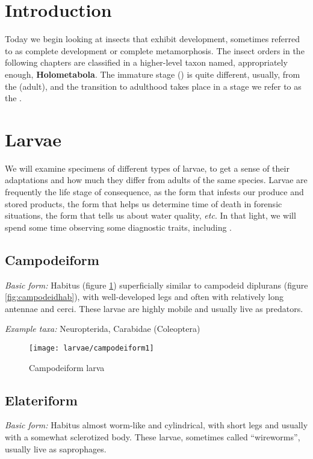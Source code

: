 \section*{Introduction}
Today we begin looking at insects that exhibit  development, sometimes referred to as complete development or complete metamorphosis. The insect orders in the following chapters are classified in a higher-level taxon named, appropriately enough, \textbf{Holometabola}. The immature stage () is quite different, usually, from the  (adult), and the transition to adulthood takes place in a stage we refer to as the . 

\section{Larvae}
We will examine specimens of different types of larvae, to get a sense of their adaptations and how much they differ from adults of the same species. Larvae are frequently the life stage of consequence, as the form that infests our produce and stored products, the form that helps us determine time of death in forensic situations, the form that tells us about water quality, \textit{etc}. In that light, we will spend some time observing some diagnostic traits, including .

\subsection{Campodeiform}
\noindent{}\textit{Basic form:} Habitus (figure \ref{fig:campodeiform1}) superficially similar to campodeid diplurans (figure \ref{fig:campodeidhab}), with well-developed legs and often with relatively long antennae and cerci. These larvae are highly mobile and usually live as predators.\vspace{3mm}

\noindent{}\textit{Example taxa:} Neuropterida, Carabidae (Coleoptera)\vspace{3mm}

\begin{figure}[ht!]
  \centering
    \texttt{[image: larvae/campodeiform1]}
  \caption{Campodeiform larva \citep[modified from][Plate XV]{bhlitem36654Larvae}}
  \label{fig:campodeiform1}
\end{figure}

\subsection{Elateriform} 
\noindent{}\textit{Basic form:} Habitus almost worm-like and cylindrical, with short legs and usually with a somewhat sclerotized body. These larvae, sometimes called ``wireworms'', usually live as saprophages.\vspace{3mm}

